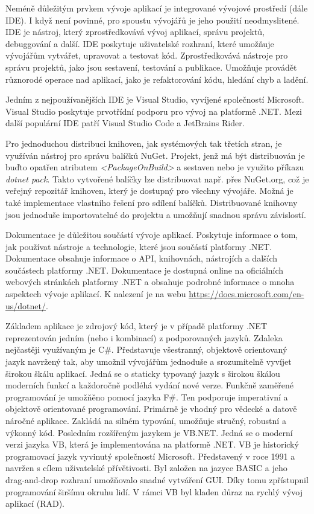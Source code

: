 Neméně důležitým prvkem vývoje aplikací je integrované vývojové prostředí (dále IDE). I když není povinné, pro spoustu vývojářů je jeho použití neodmyslitené. IDE je nástroj, který zprostředkovává vývoj aplikací, správu projektů, debuggování a další. IDE poskytuje uživatelské rozhraní, které umožňuje vývojářům vytvářet, upravovat a testovat kód. Zprostředkovává nástroje pro správu projektů, jako jsou sestavení, testování a publikace. Umožňuje provádět různorodé operace nad aplikací, jako je refaktorování kódu, hledání chyb a ladění.

Jedním z nejpoužívanějších IDE je Visual Studio, vyvíjené společností Microsoft. Visual Studio poskytuje prvotřídní podporu pro vývoj na platformě .NET. Mezi další populární IDE patří Visual Studio Code a JetBrains Rider.


Pro jednoduchou distribuci knihoven, jak systémových tak třetích stran, je využíván nástroj pro správu balíčků NuGet. Projekt, jenž má být distribuován je buďto opatřen atributem \emph{<PackageOnBuild>} a sestaven nebo je využito příkazu \emph{dotnet pack}. Takto vytvořené balíčky lze distribuovat např. přes NuGet.org, což je veřejný repozitář knihoven, který je dostupný pro všechny vývojáře. Možná je také implementace vlastního řešení pro sdílení balíčků. Distribuované knihovny jsou jednoduše importovatelné do projektu a umožňují snadnou správu závislostí.


Dokumentace je důležitou součástí vývoje aplikací. Poskytuje informace o tom, jak používat nástroje a technologie, které jsou součástí platformy .NET. Dokumentace obsahuje informace o API, knihovnách, nástrojích a dalších součástech platformy .NET. Dokumentace je dostupná online na oficiálních webových stránkách platformy .NET a obsahuje podrobné informace o mnoha aspektech vývoje aplikací. K nalezení je na webu \url{https://docs.microsoft.com/en-us/dotnet/}.


Základem aplikace je zdrojový kód, který je v případě platformy .NET reprezentován jedním (nebo i kombinací) z podporovaných jazyků. Zdaleka nejčastěji využívaným je C\#. Představuje všestranný, objektově orientovaný jazyk navržený tak, aby umožnil vývojářům jednoduše a srozumitelně vyvíjet širokou škálu aplikací. \cite{Price2023c8} Jedná se o staticky typovaný jazyk s širokou škálou moderních funkcí a každoročně podléhá vydání nové verze. 
Funkčně zaměřené programování je umožňěno pomocí jazyka F\#. Ten podporuje imperativní a objektově orientované programování. Primárně je vhodný pro vědecké a datově náročné aplikace. \cite{Price2023c8} Zakládá na silném typování, umožňuje stručný, robustní a výkonný kód. 
Posledním rozšířeným jazykem je VB.NET. Jedná se o moderní verzi jazyka VB, která je implementována na platformě .NET. VB je historický programovací jazyk vyvinutý společností Microsoft. Představený v roce 1991 a navržen s cílem uživatelské přívětivosti. Byl založen na jazyce BASIC a jeho drag-and-drop rozhraní umožňovalo snadné vytváření GUI. Díky tomu zpřístupnil programování širšímu okruhu lidí. V rámci VB byl kladen důraz na rychlý vývoj aplikací (RAD).

